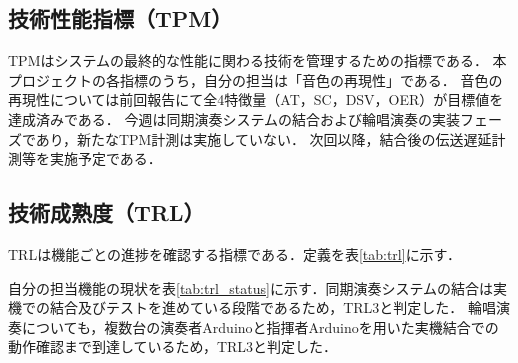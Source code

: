 \documentclass[lualatex,paper=a4paper,jafontsize=11.5pt,jafontscale=1.05]{jlreq}
\begin{document}
\subsection{技術性能指標（TPM）}
TPMはシステムの最終的な性能に関わる技術を管理するための指標である．
本プロジェクトの各指標のうち，自分の担当は「音色の再現性」である．
音色の再現性については前回報告にて全4特徴量（AT，SC，DSV，OER）が目標値を達成済みである．
今週は同期演奏システムの結合および輪唱演奏の実装フェーズであり，新たなTPM計測は実施していない．
次回以降，結合後の伝送遅延計測等を実施予定である．

\subsection{技術成熟度（TRL）}
TRLは機能ごとの進捗を確認する指標である．定義を表\ref{tab:trl}に示す．

\begin{table}[H]
  \centering
  \caption{TRLの定義}
  \label{tab:trl}
\end{table}

自分の担当機能の現状を表\ref{tab:trl_status}に示す．同期演奏システムの結合は実機での結合及びテストを進めている段階であるため，TRL3と判定した．
輪唱演奏についても，複数台の演奏者Arduinoと指揮者Arduinoを用いた実機結合での動作確認まで到達しているため，TRL3と判定した．

\begin{table}[H]
  \centering
  \caption{担当機能のTRL現状}
  \label{tab:trl_status}
\end{table}
\end{document}
